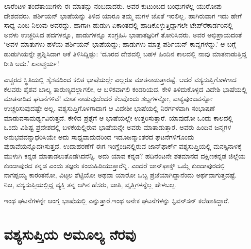 ಲಾರೆಂಟಳ ತಂದೆತಾಯಿಗಳು ಈ ಮಾತನ್ನು ನಂಬದಾದರು. ಅವರ ಕುಟುಂಬದ ಬಂಧುಗಳೆಲ್ಲ ಯುರೋಪು ದೇಶದವರು. ಪರ್ಶಿಯನ್ ಭಾಷೆಯನ್ನು ತಿಳಿದ ಯಾರೂ ತಮ್ಮ ಮಗಳ ಜೊತೆ ಇರಲಿಲ್ಲ. ಹಾಗಿರುವಾಗ ಇದು ಹೇಗೆ ಸಾಧ್ಯ ಎಂಬ ನಿಲುವು ಅವರದ್ದು. ಹಾಗಾಗಿ ಹುಡುಗಿ ಏಕಾಂತದಲ್ಲಿ ಹಾಡಿಕೊಳ್ಳುತ್ತಿದ್ದಾಗಲೇ ಟೇಪ್​ರೆಕಾರ್ಡರಿನಲ್ಲಿ ಅವಳು ಉಚ್ಚರಿಸಿದ ಪದಗಳನ್ನೂ, ಹಾಡುಗಳನ್ನೂ ಸಂಗ್ರಹಿಸಿ ಭಾಷಾತಜ್ಞರಿಗೆ ತೋರಿಸಿದರು. ಅವರ ಅಭಿಪ್ರಾಯದಂತೆ ‘ಅವಳ ಮಾತುಗಳು ಹಳೆಯ ಪರ್ಶಿಯನ್ ಭಾಷೆಯದ್ದು; ಹಾಡುಗಳು ಮಾತ್ರ ಪರ್ಶಿಯನ್ ಕಾವ್ಯಗಳದ್ದು.’ ಆ ಬಗ್ಗೆ ಹುಡುಗಿಯನ್ನೇ ಪ್ರಶ್ನಿಸಿದಾಗ ಆಕೆ ತಿಳಿಸಿದ್ದಿಷ್ಟು: ‘ದೂರದ ದೇಶದಲ್ಲಿ ಬಹಳ ಹಿಂದಿನ ಕಾಲದಲ್ಲಿ ನಾವು ಮಾತನಾಡುತ್ತಿದ್ದ ರೀತಿ ಅದು.’ ಏನಾಶ್ಚರ್ಯ!

ಎಚ್ಚರದ ಸ್ಥಿತಿಯಲ್ಲಿ ಶೈಶವದಿಂದ ಕಲಿತ ಭಾಷೆಯಲ್ಲೇ ಎಲ್ಲರೂ ಮಾತನಾಡುತ್ತಾರಷ್ಟೆ. ಆದರೆ ವಶ್ಯಸುಪ್ತಿಗೊಳಗಾದ ಕೆಲವರು ಶೈಶವ ಬಾಲ್ಯ ತಾರುಣ್ಯದಲ್ಲಾಗಲೀ, ಆ ಬಳಿಕವಾಗಲಿ ಕಂಡರಿಯದ, ಕೇಳಿ ತಿಳಿದುಕೊಳ್ಳದ ವಿದೇಶಿ ಭಾಷೆಯಲ್ಲಿ ಮಾತನಾಡಿದ ಘಟನೆಗಳಿವೆ! ಮಾತ ನಾಡುವುದೆಂದರೆ ಕೆಲವೊಂದು ಶಬ್ದಗಳನ್ನೋ, ವಾಕ್ಯಪುಂಜವನ್ನೋ ಉಚ್ಚರಿಸುವುದಷ್ಟೇ ಅಲ್ಲ. ವಶ್ಯಸುಪ್ತಿಗೊಳಗಾದಾಗ ಆ ವಿದೇಶೀ ಭಾಷೆಯಲ್ಲಿ ನಿರರ್ಗಳವಾಗಿ ಸಂಭಾಷಣೆ ಮಾಡುವ\break ಸಾಮರ್ಥ್ಯವಿರುತ್ತದೆ. ಕೇಳಿದ ಪ್ರಶ್ನೆಗೆ ಆ ಭಾಷೆಯಲ್ಲೇ ಉತ್ತರಿಸುತ್ತಾರೆ. ಯಾವುದೋ ಒಂದು ಕಾಲದಲ್ಲಿ ಒಂದು ವಿಶಿಷ್ಟ ಪ್ರದೇಶದಲ್ಲಿ ಬಳಕೆಯಲ್ಲಿರುವ ಭಾಷೆಯನ್ನೇ ಅವರು ಮಾತಾಡುತ್ತಾರೆ. ಅವರು ಹಿಂದಿನ ಜನ್ಮಗಳ ಅನುಭವವನ್ನಾಧರಿಸಿಯೇ ಅದು ಸಾಧ್ಯವಾದುದರಿಂದ ಇದೂ\break ಜನ್ಮಾಂತರದ ಘಟನೆಗಳಿಗೊಂದು ಪುರಾವೆಯನ್ನೊದಗಿಸುತ್ತದೆ. ಉದಾಹರಣೆಗೆ ಈಗ ಇಂಗ್ಲೆಂಡಿನಲ್ಲಿರುವ ಜಾನ್​ಫಾರ್ಕ್ ವಶ್ಯಸುಪ್ತಿಯಲ್ಲಿ ಮನಸ್ಸಿನಾಳಕ್ಕೆ ಮುಳುಗಿ ಕನ್ನಡ ಮಾತಾಡಲು\break ತೊಡಗಿದನೆನ್ನಿ. ಅದು ಯಾವ ಕನ್ನಡ? ಹದಿನೆಂಟನೇ ಶತಮಾನದ ದಕ್ಷಿಣಕನ್ನಡ ಜಿಲ್ಲೆಯ ಕುಂದಾಪುರದ ಕನ್ನಡ ಎಂದು ತಜ್ಞರು ಕಂಡುಹಿಡಿಯುತ್ತಾರೆನ್ನಿ. ಎಂದರೆ ಜಾನ್​ಫಾಕ್ಸ್ ಒಮ್ಮೆ ಕುಂದಾಪುರದಲ್ಲಿ ನಾಗಪ್ಪಯ್ಯ ಕಾರಂತನೋ, ವಿಟ್ಠಲ ಶೆಟ್ಟಿಯೋ ಅಥವಾ ಯಾರೋ ಒಬ್ಬ ಪ್ರಜೆಯಾಗಿದ್ದಾನೆಂದು ಅರ್ಥವಾಗುತ್ತದಷ್ಟೆ. ನಿಜ, ವಶ್ಯಸುಪ್ತಿಯಲ್ಲಿದ್ದ ವ್ಯಕ್ತಿ ತನ್ನ ಆಗಿನ ಹೆಸರು, ಜಾತಿ, ವೃತ್ತಿಗಳನ್ನೆಲ್ಲ ಹೇಳಬಲ್ಲ.

ಇಂಥ ಘಟನೆಗಳನ್ನೇ ಆಂಗ್ಲ ಭಾಷೆಯಲ್ಲಿ  ಎನ್ನುತ್ತಾರೆ.\break ಇಂಥ ಅನೇಕ ಘಟನೆಗಳನ್ನು ಸ್ಟಿವನ್​ಸನ್ ಕಲೆಹಾಕಿದ್ದಾರೆ.


\section*{ವಶ್ಯಸುಪ್ತಿಯ ಅಮೂಲ್ಯ ನೆರವು}

\vskip -6.2pt

